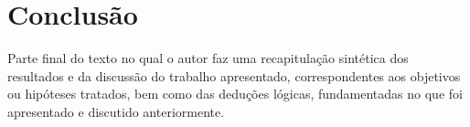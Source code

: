 \chapter{Conclusão}

Parte final do texto no qual o autor faz uma recapitulação sintética dos
resultados e da discussão do trabalho apresentado, correspondentes aos objetivos
ou hipóteses tratados, bem como das deduções lógicas, fundamentadas no que foi
apresentado e discutido anteriormente.